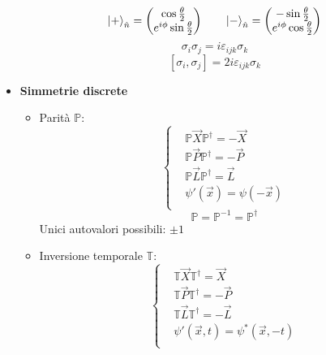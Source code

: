 \documentclass{article}
\DeclarePairedDelimiter\ket{\lvert}{\rangle}
\begin{document}
\begin{footnotesize}
\begin{multicols*}{3}
\begin{itemize}[leftmargin=*]
		\[\ket*{+}_{\hat{n}} = \begin{pmatrix} \cos\frac{\theta }{2} \\ e^{i\phi }\sin\frac{\theta }{2}\end{pmatrix}
		\hspace{20pt} \ket*{-}_{\hat{n}} = \begin{pmatrix} -\sin\frac{\theta }{2} \\ e^{i\phi }\cos\frac{\theta }{2}\end{pmatrix}
\]
		\[\sigma _i\sigma _j = i\varepsilon _{ijk}\sigma _k\]
		\[\left[\sigma _i,\sigma _j\right] = 2i\varepsilon _{ijk}\sigma _k\]

	\item \textbf{Simmetrie discrete}
		\begin{itemize}
			\item Parità $\mathbb{P}$:
				\[
					\left\{\begin{aligned}
						&\mathbb{P}\vec{X}\mathbb{P}^\dag=-\vec{X}\\
						&\mathbb{P}\vec{P}\mathbb{P}^\dag=-\vec{P}\\
						&\mathbb{P}\vec{L}\mathbb{P}^\dag=\vec{L}\\
						&\psi '(\vec{x})= \psi (-\vec{x})\\
					\end{aligned}\right.
				\]
				\[\mathbb{P}=\mathbb{P}^{-1} = \mathbb{P}^\dag\]
				Unici autovalori possibili: $\pm1$
			\item Inversione temporale $\mathbb{T}$:
				\[
					\left\{\begin{aligned}
						&\mathbb{T}\vec{X}\mathbb{T}^\dag=\vec{X}\\
						&\mathbb{T}\vec{P}\mathbb{T}^\dag=-\vec{P}\\
						&\mathbb{T}\vec{L}\mathbb{T}^\dag=-\vec{L}\\
						&\psi '(\vec{x},t)= \psi^* (\vec{x},-t)\\
					\end{aligned}\right.
				\]


\end{itemize}
\end{itemize}
\end{multicols*}
\end{footnotesize}
\end{document}
